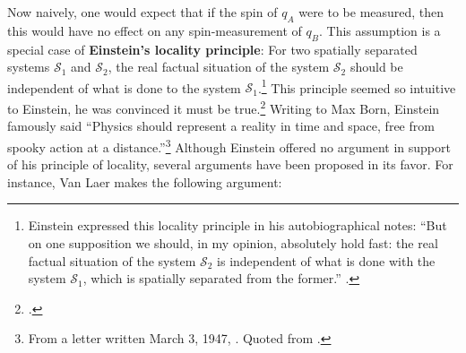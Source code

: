 Now naively, one would expect that if the spin of $q_A$ were to be measured, then this would have no effect on any spin-measurement of $q_B$. This assumption is a special case of \textbf{Einstein's locality principle}:\label{EinsteinLocalityPrinciple} For two spatially separated systems $\mathcal{S}_1$ and $\mathcal{S}_2$, %
%
the real factual situation of the system $\mathcal{S}_2$ should be independent of what is done to the system $\mathcal{S}_1$.\footnote{Einstein expressed this locality principle in his autobiographical notes: ``But on one supposition we should, in my opinion, absolutely hold fast: the real factual situation of the system $\mathcal{S}_2$ is independent of what is done with the system $\mathcal{S}_1$, which is spatially separated from the former.'' \cite[p. 85]{EinsteinLocality}.} This principle seemed so intuitive to Einstein, he was convinced it must be true.\footnote{\cite[449]{IsaacsonWalter2008E:hl}.} Writing to Max Born, Einstein famously said ``Physics should represent a reality in time and space, free from spooky  action at a distance.''\footnote{From a letter written March 3, 1947, \cite[155]{BornMax2005TBl:}. Quoted from \cite[450]{IsaacsonWalter2008E:hl}.} Although Einstein offered no argument in support of his principle of locality, several arguments have been proposed in its favor. For instance,  Van Laer makes the following argument: 
